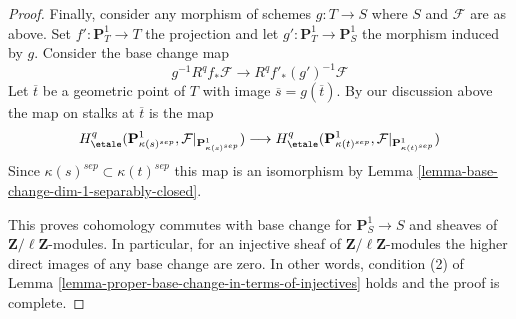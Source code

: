 \begin{proof}
\medskip\noindent
Finally, consider any morphism of schemes $g : T \to S$ where
$S$ and $\mathcal{F}$ are as above.
Set $f' : \mathbf{P}^1_T \to T$ the projection and let
$g' : \mathbf{P}^1_T \to \mathbf{P}^1_S$ the morphism induced
by $g$. Consider the base change map
$$
g^{-1}R^qf_*\mathcal{F}
\longrightarrow
R^qf'_*(g')^{-1}\mathcal{F}
$$
Let $\overline{t}$ be a geometric point of $T$ with image
$\overline{s} = g(\overline{t})$. By our discussion
above the map on stalks at $\overline{t}$ is the map
$$
H^q_\etale(\mathbf{P}^1_{\kappa(s)^{sep}},
\mathcal{F}|_{\mathbf{P}^1_{\kappa(s)^{sep}}})
\longrightarrow
H^q_\etale(\mathbf{P}^1_{\kappa(t)^{sep}},
\mathcal{F}|_{\mathbf{P}^1_{\kappa(t)^{sep}}})
$$
Since $\kappa(s)^{sep} \subset \kappa(t)^{sep}$ this map is an
isomorphism by Lemma \ref{lemma-base-change-dim-1-separably-closed}.

\medskip\noindent
This proves cohomology commutes with base change for
$\mathbf{P}^1_S \to S$ and sheaves of $\mathbf{Z}/\ell\mathbf{Z}$-modules.
In particular, for an injective sheaf of $\mathbf{Z}/\ell\mathbf{Z}$-modules
the higher direct images of any base change are zero.
In other words, condition (2) of
Lemma \ref{lemma-proper-base-change-in-terms-of-injectives}
holds and the proof is complete.
\end{proof}